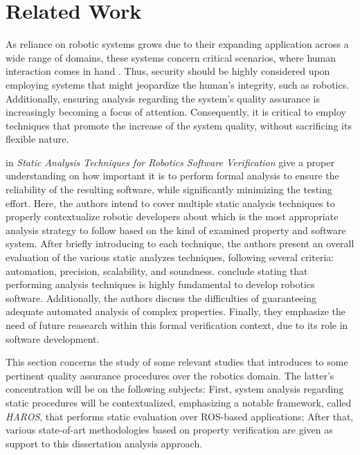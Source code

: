 \section{Related Work}\label{s:relWork-pv}

As reliance on robotic systems grows due to their expanding application across a wide range of domains, these systems concern critical scenarios, where human interaction comes in hand \cite{diluoffo2018robot}. Thus, security should be highly considered upon employing systems that might jeopardize the human's integrity, such as robotics. Additionally, ensuring analysis regarding the system's quality assurance is increasingly becoming a focus of attention. Consequently, it is critical to employ techniques that promote the increase of the system quality, without sacrificing its flexible nature.

\citeauthor{cortesi2013static} in \textit{Static Analysis Techniques
for Robotics Software Verification} \cite{cortesi2013static} give a proper understanding on how important it is to perform formal analysis to ensure  the reliability of the resulting software, while significantly minimizing the testing effort. Here, the authors intend to cover multiple static analysis techniques to properly contextualize robotic developers about which is the most appropriate analysis strategy to follow based on the kind of examined property and software system. After briefly introducing to each technique, the authors present an overall evaluation of the various static analyzes techniques, following several criteria: automation, precision, scalability, and soundness. \citeauthor*{cortesi2013static} conclude stating that performing analysis techniques is highly fundamental to develop robotics software. Additionally, the authors discuss the difficulties of guaranteeing adequate automated analysis of complex properties. Finally, they emphasize the need of future reasearch within this formal verification context, due to its role in software development. 

This section concerns the study of some relevant studies that introduces to some pertinent quality assurance procedures over the robotics domain. The latter's concentration will be on the following subjects: First, system analysis regarding static procedures will be contextualized, emphasizing a notable framework, called \textit{HAROS}, that performs static evaluation over ROS-based applications; After that, various state-of-art methodologies based on property verification are given as support to this dissertation analysis approach.

